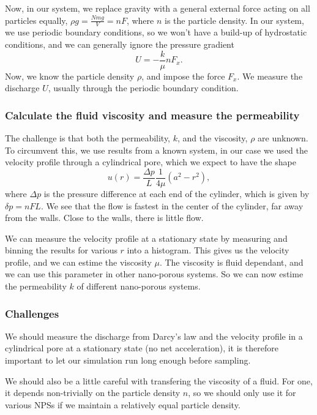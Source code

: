 \documentclass[a4paper, 11pt, notitlepage, english]{article}
\begin{document}
Now, in our system, we replace gravity with a general external force acting on all particles equally, $\rho g = \frac{N mg}{V} = n F$, where $n$ is the particle density. In our system, we use periodic boundary conditions, so we won't have a build-up of hydrostatic conditions, and we can generally ignore the pressure gradient
$$U = -\frac{k}{\mu}n F_x.$$
Now, we know the particle density $\rho$, and impose the force $F_x$. We measure the discharge $U$, usually through the periodic boundary condition.

\subsubsection*{Calculate the fluid viscosity and measure the permeability}

The challenge is that both the permeability, $k$, and the viscosity, $\rho$ are unknown. To circumvent this, we use results from a known system, in our case we used the velocity profile through a cylindrical pore, which we expect to have the shape
$$u(r) = \frac{\Delta p}{L} \frac{1}{4\mu}(a^2 - r^2),$$
where $\Delta p$ is the pressure difference at each end of the cylinder, which is given by $\delta p = nFL$. We see that the flow is fastest in the center of the cylinder, far away from the walls. Close to the walls, there is little flow. 

We can measure the velocity profile at a stationary state by measuring and binning the results for various $r$ into a histogram. This gives us the velocity profile, and we can estime the viscosity $\mu$. The viscosity is fluid dependant, and we can use this parameter in other nano-porous systems. So we can now estime the permeability $k$ of different nano-porous systems. 

\subsubsection*{Challenges}

We should measure the discharge from Darcy's law and the velocity profile in a cylindrical pore at a stationary state (no net acceleration), it is therefore important to let our simulation run long enough before sampling.

We should also be a little careful with transfering the viscosity of a fluid. For one, it depends non-trivially on the particle density $n$, so we should only use it for various NPSs if we maintain a relatively equal particle density.

\clearpage
\end{document}
